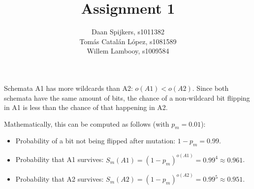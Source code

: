 \documentclass{scrartcl}
\title{Assignment 1}
\author{Daan Spijkers, s1011382\\ Tomás Catalán López, s1081589\\ Willem Lambooy, s1009584}
\begin{document}
\maketitle

\begin{abstract}

\end{abstract}

\section{}
Schemata A1 has more wildcards than A2: $o(A1) < o(A2)$. Since both schemata have the same amount of bits, the chance of a non-wildcard bit flipping in A1 is less than the chance of that happening in A2.

Mathematically, this can be computed as follows (with $p_m=0.01$):
\begin{itemize}
 \item Probability of a bit not being flipped after mutation: $1-p_m=0.99$.
 \item Probability that A1 survives: $S_m(A1)=(1-p_m)^{o(A1)}=0.99^4\approx0.961$.
 \item Probability that A2 survives: $S_m(A2)=(1-p_m)^{o(A2)}=0.99^5\approx0.951$.
\end{itemize}
\end{document}
